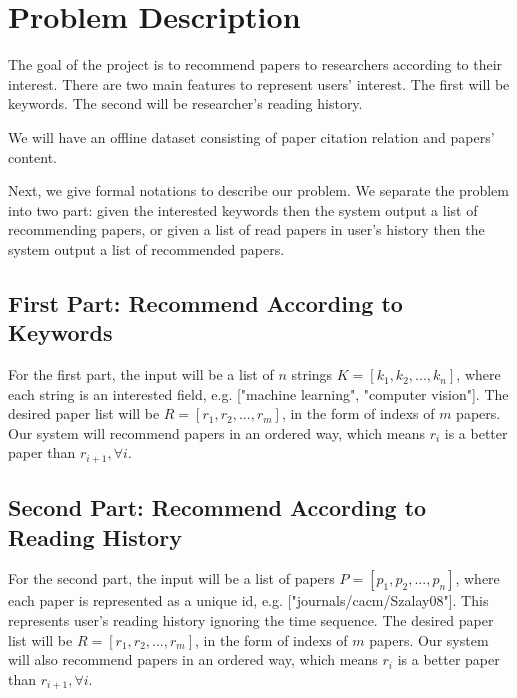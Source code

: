 \section{Problem Description} \label{sec:problem}

The goal of the project is to recommend papers to researchers according to their interest. There are two main features to represent users' interest. The first will be keywords. The second will be researcher's reading history.  

We will have an offline dataset consisting of paper citation relation and papers' content.

Next, we give formal notations to describe our problem. We separate the problem into two part: given the interested keywords then the system output a list of recommending papers, or given a list of read papers in user's history then the system output a list of recommended papers. 

\subsection{First Part: Recommend According to Keywords}

For the first part, the input will be a list of $n$ strings $K = [k_1, k_2, ..., k_n]$, where each string is an interested field, e.g. ["machine learning", "computer vision"]. The desired paper list will be $R = [r_1, r_2, ..., r_m]$, in the form of indexs of $m$ papers. Our system will recommend papers in an ordered way, which means $r_i$ is a better paper than $r_{i+1}, \forall i$.

\subsection{Second Part: Recommend According to Reading History}

For the second part, the input will be a list of papers $P = [p_1, p_2, ..., p_n]$, where each paper is represented as a unique id, e.g. ["journals/cacm/Szalay08"]. This represents user's reading history ignoring the time sequence. The desired paper list will be $R =  [r_1, r_2, ..., r_m]$, in the form of indexs of $m$ papers. Our system will also recommend papers in an ordered way, which means $r_i$ is a better paper than $r_{i+1}, \forall i$.

